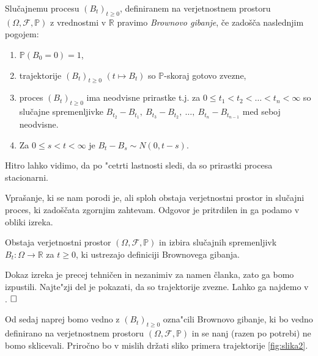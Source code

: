 \documentclass[twoside,11pt]{article}
\begin{document}
\pagebreak

\begin{definicija}
    Slučajnemu procesu $(B_t)_{t\geq 0}$, definiranem na verjetnostnem prostoru $(\Omega, \mathcal{F}, \mathbb{P})$
    z vrednostmi v $\mathbb{R}$ pravimo \textit{Brownovo gibanje}, če 
    zadošča naslednjim pogojem:
    \begin{enumerate}
        \item $\mathbb{P}(B_0 = 0) = 1$,
        \item trajektorije $(B_t)_{t\geq0}$ $(t \mapsto B_t)$ so $\mathbb{P}$-skoraj gotovo zvezne,
        \item proces $\left(B_t\right)_{t \geq 0}$ ima neodvisne prirastke t.j. za $0 \leq t_1 < t_2 < \ldots < t_n < \infty$ so slučajne spremenljivke
            $B_{t_2} - B_{t_1}, \ B_{t_3} - B_{t_2}, \ \ldots, \ B_{t_n} - B_{t_{n-1}}$ med seboj neodvisne. 
        \item Za $ 0 \leq s < t < \infty$ je $B_t - B_s \sim N(0, t-s)$.
    \end{enumerate}
\end{definicija}

\begin{opomba}
    Hitro lahko vidimo, da po "cetrti lastnosti sledi, da so prirastki procesa stacionarni.
\end{opomba}

Vprašanje, ki se nam porodi je, ali sploh obstaja verjetnostni prostor 
in slučajni proces, ki zadoščata zgornjim zahtevam. Odgovor je pritrdilen in ga 
podamo v obliki izreka.

\begin{izrek}
    Obstaja verjetnostni prostor $(\Omega, \mathcal{F}, \mathbb{P})$ in
    izbira slučajnih spremenljivk $B_t : \Omega \to \mathbb{R}$ za $t \geq 0$,
    ki ustrezajo definiciji Brownovega gibanja.
\end{izrek}

\begin{dokaz}
    Dokaz izreka je precej tehničen in nezanimiv za namen članka, zato ga bomo izpustili. Najte"zji del je 
    pokazati, da so trajektorije zvezne. Lahko ga najdemo v \cite{1}. $\hfill \square$
\end{dokaz}


Od sedaj naprej bomo vedno z $(B_t)_{t\geq 0}$ ozna"cili Brownovo gibanje, ki bo vedno definirano na 
verjetnostnem prostoru $(\Omega, \mathcal{F}, \mathbb{P})$ in se nanj (razen po potrebi) ne 
bomo sklicevali. Priročno bo v mislih držati sliko primera trajektorije  \ref{fig:slika2}.
\end{document}

